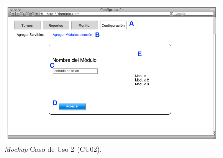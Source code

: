 \begin{figure}[H]
\centering
\includegraphics[scale=0.55]{images/capitulo4/mockupCU02.png}
\caption{\textit{Mockup} Caso de Uso 2 (CU02).}
\label{mockupCU01}
\end{figure}

